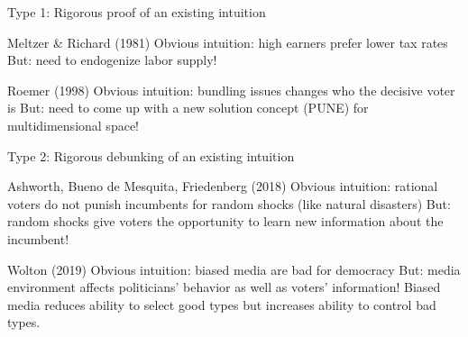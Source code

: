 \documentclass[11pt,aspectratio=169]{beamer}
\begin{document}
\begin{frame}{Type 1: Rigorous proof of an existing intuition}

\begin{outline}
\1 Meltzer \& Richard (1981)
\2 Obvious intuition: high earners prefer lower tax rates
\pause 
\2 \alert{But}: need to endogenize labor supply!

\pause 

\vspace{1em}
\1 Roemer (1998)
\2 Obvious intuition: bundling issues changes who the decisive voter is
\pause 
\2 \alert{But}: need to come up with a new solution concept (PUNE) for multidimensional space!

\end{outline}

\end{frame}

\begin{frame}{Type 2: Rigorous debunking of an existing intuition}

\begin{outline}
\1 Ashworth, Bueno de Mesquita, Friedenberg (2018)
\2 Obvious intuition: rational voters do not punish incumbents for random shocks (like natural disasters)
\pause
\2 \alert{But}: random shocks give voters the opportunity to learn new information about the incumbent! 

\pause 

\vspace{1em}
\1 Wolton (2019)
\2 Obvious intuition: biased media are bad for democracy
\pause
\2 \alert{But}: media environment affects politicians' behavior as well as voters' information! Biased media reduces ability to select good types but increases ability to control bad types.

\end{outline}

\end{frame}
\end{document}
